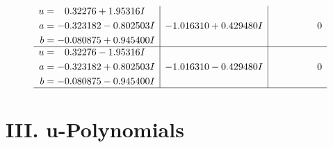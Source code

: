 \documentclass[1p]{elsarticle_modified}
\theoremstyle{definition}
\begin{document}
$$\begin{array}{c|c|c}
\begin{aligned}
u &= \phantom{-}0.32276 + 1.95316 I \\
a &= -0.323182 - 0.802503 I \\
b &= -0.080875 + 0.945400 I\end{aligned}
 & -1.016310 + 0.429480 I & \phantom{-0.000000 } 0 \\ \hline\begin{aligned}
u &= \phantom{-}0.32276 - 1.95316 I \\
a &= -0.323182 + 0.802503 I \\
b &= -0.080875 - 0.945400 I\end{aligned}
 & -1.016310 - 0.429480 I & \phantom{-0.000000 } 0\\
 \hline 
 \end{array}$$\newpage
\newpage\renewcommand{\arraystretch}{1}
\centering \section*{ III. u-Polynomials}
\end{document}
